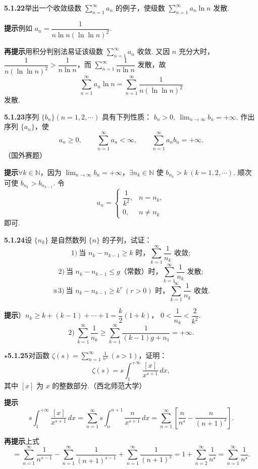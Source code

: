 \documentclass[UTF8, 12pt, fontset=fandol, oneside]{ctexart}
\begin{document}
\noindent\textbf{5.1.22}\quad 举出一个收敛级数 $\displaystyle\sum_{n=1}^{\infty}a_n$ 的例子，使级数
$\displaystyle\sum_{n=1}^{\infty}a_n\ln n$ 发散.

\noindent\textbf{提示}\quad 例如 $a_n=\dfrac1{n\ln n(\ln\ln n)^2}$.

\noindent\textbf{再提示}\quad 用积分判别法易证该级数 $\displaystyle\sum_{n=1}^{\infty}a_n$ 收敛. 又因 $n$ 充分大时，
$\dfrac1{n(\ln\ln n)^2}>\dfrac1{n\ln n}$，而
$\displaystyle\sum_{n=1}^{\infty}\dfrac1{n\ln n}$ 发散，故
\[
  \sum_{n=1}^{\infty}a_n\ln n
  =\sum_{n=1}^{\infty}\frac1{n(\ln\ln n)^2}
\]
发散.

\noindent\textbf{5.1.23}\quad 序列 $\{b_n\}(n=1,2,\cdots)$ 具有下列性质：
$b_n>0,\ \lim_{n\to\infty}b_n=+\infty$. 作出序列 $\{a_n\}$，使
\[
  a_n\ge0,\qquad \sum_{n=1}^{\infty}a_n<\infty,\qquad
  \sum_{n=1}^{\infty}a_nb_n=+\infty.
\]
（国外赛题）

\noindent\textbf{提示}\quad $\forall k\in\mathbb N$，因为
$\lim_{n\to\infty}b_n=+\infty$，$\exists n_k\in\mathbb N$ 使
$b_{n_k}>k\ (k=1,2,\cdots)$. 顺次可使 $b_{n_k}>b_{n_{k-1}}$. 令
\[
  a_n=
  \begin{cases}
  \dfrac1{k^2}, & n=n_k,\\
  0, & n\ne n_k
  \end{cases}
\]
即可.

\noindent\textbf{5.1.24}\quad 设 $\{n_k\}$ 是自然数列 $\{n\}$ 的子列，试证：
\[
  1)\ \text{当 }n_k-n_{k-1}\ge k\text{ 时，}\sum_{k=1}^{\infty}\frac1{n_k}\text{ 收敛};
\]
\[
  2)\ \text{当 }n_k-n_{k-1}\le g\text{（常数）时，}\sum_{k=1}^{\infty}\frac1{n_k}\text{ 发散};
\]
\[
  ※3)\ \text{当 }n_k-n_{k-1}\ge k^r\ (r>0)\text{ 时，}\sum_{k=1}^{\infty}\frac1{n_k}\text{ 收敛}.
\]

\noindent\textbf{提示}）$n_k\ge k+(k-1)+\cdots+1=\dfrac{k}{2}(1+k)$，
$0<\dfrac1{n_k}<\dfrac2{k^2}$.
\[
  2)\ \sum_{k=1}^{\infty}\frac1{n_k}
  \ge\sum_{k=1}^{\infty}\frac1{(k-1)g+n_1}=+\infty.
\]

\noindent\textbf{$\star$5.1.25}\quad 对函数
$\displaystyle\zeta(s)=\sum_{n=1}^{\infty}\frac1{n^s}\ (s>1)$，证明：
\[
  \zeta(s)=s\int_1^{+\infty}\frac{[x]}{x^{s+1}}\,dx,
\]
其中 $[x]$ 为 $x$ 的整数部分.（西北师范大学）

\noindent\textbf{提示}\quad
\[
  s\int_1^{+\infty}\frac{[x]}{x^{s+1}}\,dx
  =\sum_{n=1}^{\infty}s\int_n^{n+1}\frac{n}{x^{s+1}}\,dx
  =\sum_{n=1}^{\infty}\left[\frac n{n^s}-\frac n{(n+1)^s}\right].
\]

\noindent\textbf{再提示}\quad 上式
\[
  =\sum_{n=1}^{\infty}\frac1{n^{s-1}}
   -\sum_{n=1}^{\infty}\frac1{(n+1)^{s-1}}
   +\sum_{n=1}^{\infty}\frac1{(n+1)^s}
  =1+\sum_{n=2}^{\infty}\frac1{n^s}
  =\sum_{n=1}^{\infty}\frac1{n^s}.
\]
\end{document}
